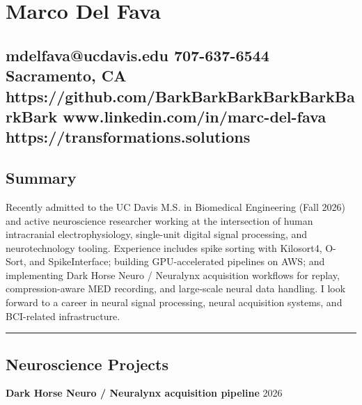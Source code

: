 \documentclass[11pt]{article}
\begin{document}

\section{Marco Del Fava}\label{marco-del-fava}

\subsection{mdelfava@ucdavis.edu \textbar{} 707-637-6544 \textbar{}
Sacramento, CA \textbar{}
https://github.com/BarkBarkBarkBarkBarkBarkBark \textbar{}
www.linkedin.com/in/marc-del-fava \textbar{}
https://transformations.solutions}\label{mdelfavaucdavis.edu-707-637-6544-sacramento-ca-httpsgithub.combarkbarkbarkbarkbarkbarkbark-www.linkedin.cominmarc-del-fava-httpstransformations.solutions}

\subsection{Summary}\label{summary}

Recently admitted to the UC Davis M.S. in Biomedical Engineering (Fall
2026) and active neuroscience researcher working at the intersection of
human intracranial electrophysiology, single-unit digital signal
processing, and neurotechnology tooling. Experience includes spike
sorting with Kilosort4, O-Sort, and SpikeInterface; building
GPU-accelerated pipelines on AWS; and implementing Dark Horse Neuro /
Neuralynx acquisition workflows for replay, compression-aware MED
recording, and large-scale neural data handling. I look forward to a
career in neural signal processing, neural acquisition systems, and
BCI-related infrastructure.

\begin{center}\rule{0.5\linewidth}{0.5pt}\end{center}

\subsection{Neuroscience Projects}\label{neuroscience-projects}

\textbf{Dark Horse Neuro / Neuralynx acquisition pipeline} \textbar{}
2026
\end{document}
